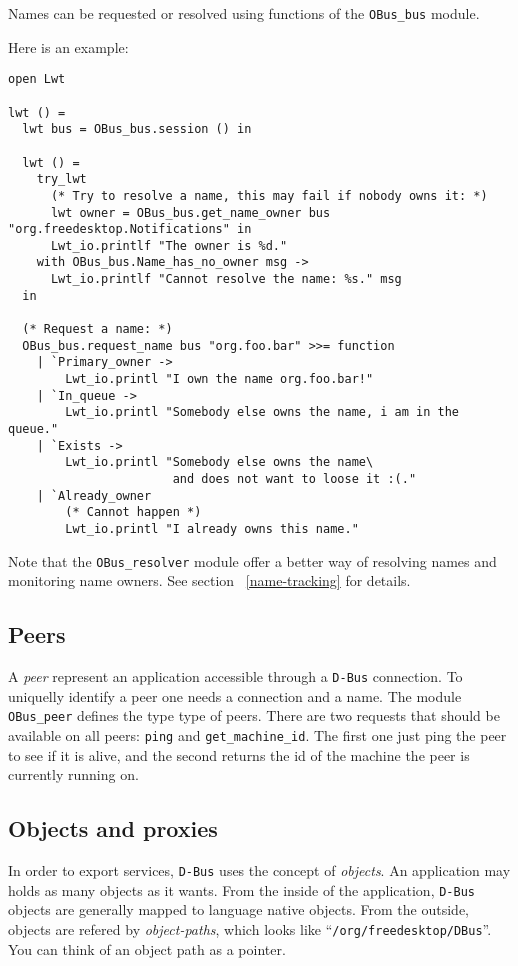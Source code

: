 \documentclass{article}
\newcommand{\dbus}{\texttt{D-Bus}\xspace}
\begin{document}
Names can be requested or resolved using functions of the
\texttt{OBus\_bus} module.

Here is an example:

\lstset{language=[Objective]Caml}
\begin{lstlisting}
open Lwt

lwt () =
  lwt bus = OBus_bus.session () in

  lwt () =
    try_lwt
      (* Try to resolve a name, this may fail if nobody owns it: *)
      lwt owner = OBus_bus.get_name_owner bus "org.freedesktop.Notifications" in
      Lwt_io.printlf "The owner is %d."
    with OBus_bus.Name_has_no_owner msg ->
      Lwt_io.printlf "Cannot resolve the name: %s." msg
  in

  (* Request a name: *)
  OBus_bus.request_name bus "org.foo.bar" >>= function
    | `Primary_owner ->
        Lwt_io.printl "I own the name org.foo.bar!"
    | `In_queue ->
        Lwt_io.printl "Somebody else owns the name, i am in the queue."
    | `Exists ->
        Lwt_io.printl "Somebody else owns the name\
                       and does not want to loose it :(."
    | `Already_owner
        (* Cannot happen *)
        Lwt_io.printl "I already owns this name."
\end{lstlisting}

Note that the \texttt{OBus\_resolver} module offer a better way of
resolving names and monitoring name owners. See section
~\ref{name-tracking} for details.

\subsection{Peers}

A \emph{peer} represent an application accessible through a \dbus
connection.  To uniquelly identify a peer one needs a connection and a
name. The module \texttt{OBus\_peer} defines the type type of
peers. There are two requests that should be available on all peers:
\texttt{ping} and \texttt{get\_machine\_id}.  The first one just ping
the peer to see if it is alive, and the second returns the id of the
machine the peer is currently running on.

\subsection{Objects and proxies}

In order to export services, \dbus uses the concept of
\emph{objects}. An application may holds as many objects as it
wants. From the inside of the application, \dbus objects are generally
mapped to language native objects. From the outside, objects are
refered by \emph{object-paths}, which looks like
``\texttt{/org/freedesktop/DBus}''. You can think of an object path as
a pointer.
\end{document}
